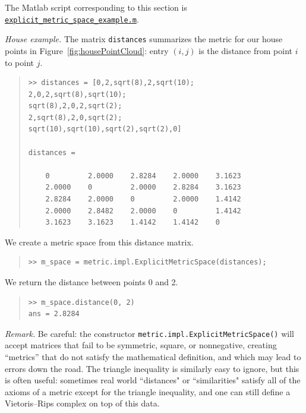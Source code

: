 \documentclass[amscd, amssymb, verbatim]{amsart}[12pt]
\theoremstyle{remark}
\theoremstyle{remark}
\theoremstyle{remark}
\begin{document}
The Matlab script corresponding to this section is \href{https://github.com/appliedtopology/javaplex/tree/master/src/matlab/for_distribution/tutorial_examples/explicit_metric_space_example.m}{\texttt{explicit\_metric\_space\_example.m}}. 

{\em House example.} The matrix \texttt{distances} summarizes the metric for our house points in Figure~\ref{fig:housePointCloud}: entry $(i,j)$ is the distance from point $i$ to point $j$. 

\begin{quote} \begin{verbatim}
>> distances = [0,2,sqrt(8),2,sqrt(10);
2,0,2,sqrt(8),sqrt(10);
sqrt(8),2,0,2,sqrt(2);
2,sqrt(8),2,0,sqrt(2);
sqrt(10),sqrt(10),sqrt(2),sqrt(2),0]

distances =

    0         2.0000    2.8284    2.0000    3.1623
    2.0000    0         2.0000    2.8284    3.1623
    2.8284    2.0000    0         2.0000    1.4142
    2.0000    2.8482    2.0000    0         1.4142
    3.1623    3.1623    1.4142    1.4142    0
\end{verbatim} \end{quote}

We create a metric space from this distance matrix.

\begin{quote} \begin{verbatim}
>> m_space = metric.impl.ExplicitMetricSpace(distances);
\end{verbatim} \end{quote}

We return the distance between points 0 and 2.

\begin{quote} \begin{verbatim}
>> m_space.distance(0, 2)
ans = 2.8284 
\end{verbatim} \end{quote}

{\em Remark.} Be careful: the constructor \texttt{metric.impl.ExplicitMetricSpace()} will accept matrices that fail to be symmetric, square, or nonnegative, creating ``metrics'' that do not satisfy the mathematical definition, and which may lead to errors down the road. The triangle inequality is similarly easy to ignore, but this is often useful: sometimes real world ``distances" or ``similarities" satisfy all of the axioms of a metric except for the triangle inequality, and one can still define a Vietoris--Rips complex on top of this data.
\end{document}
